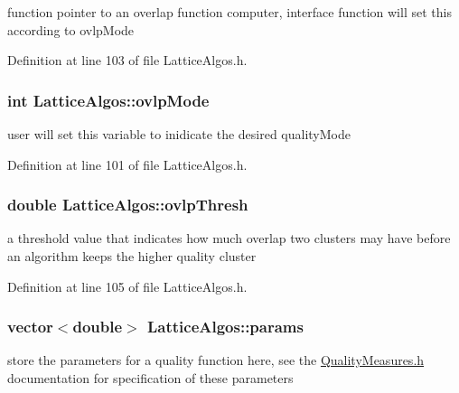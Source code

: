 function pointer to an overlap function computer, interface function will set this according to ovlpMode 



Definition at line 103 of file LatticeAlgos.h.

\hypertarget{class_lattice_algos_a7a9a7568a564e929c494c7c94ed5dda5}{
\subsubsection[{ovlpMode}]{\setlength{\rightskip}{0pt plus 5cm}int {\bf LatticeAlgos::ovlpMode}}}
\label{class_lattice_algos_a7a9a7568a564e929c494c7c94ed5dda5}


user will set this variable to inidicate the desired qualityMode 



Definition at line 101 of file LatticeAlgos.h.

\hypertarget{class_lattice_algos_ae50e2eab1478e1bced92b0f1f1bcdc09}{
\subsubsection[{ovlpThresh}]{\setlength{\rightskip}{0pt plus 5cm}double {\bf LatticeAlgos::ovlpThresh}}}
\label{class_lattice_algos_ae50e2eab1478e1bced92b0f1f1bcdc09}


a threshold value that indicates how much overlap two clusters may have before an algorithm keeps the higher quality cluster 



Definition at line 105 of file LatticeAlgos.h.

\hypertarget{class_lattice_algos_a84a7c48411084ff5d792af41e57ce96a}{
\subsubsection[{params}]{\setlength{\rightskip}{0pt plus 5cm}vector$<$double$>$ {\bf LatticeAlgos::params}}}
\label{class_lattice_algos_a84a7c48411084ff5d792af41e57ce96a}


store the parameters for a quality function here, see the \hyperlink{_quality_measures_8h}{QualityMeasures.h} documentation for specification of these parameters 



